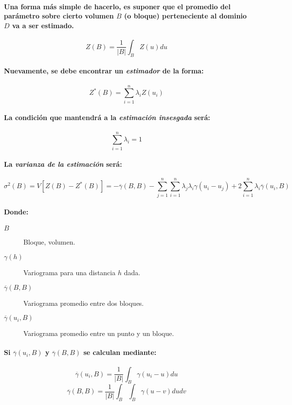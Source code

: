 \paragraph{
Una forma más simple de hacerlo, es suponer que el promedio del parámetro sobre cierto volumen $B$ (o bloque) perteneciente al dominio $D$ va a ser estimado.
}
\begin{equation}
Z(B) = \frac{1}{|B|}\int_{B}Z(u)du
\end{equation}
\paragraph{
Nuevamente, se debe encontrar un \emph{estimador} de la forma:
}
\begin{equation}
Z^*(B)=\sum_{i=1}^n\lambda_i Z(u_i)
\end{equation}
\paragraph{
La condición que mantendrá a la \emph{estimación insesgada} será:
}
\begin{equation}
\sum_{i=1}^n\lambda_i = 1
\end{equation}
\paragraph{
La \emph{varianza de la estimación} será:
}
\begin{equation}
\sigma^2(B) = V[Z(B)-Z^*(B)] = - \overline{\gamma}(B,B) - \sum_{j=1}^n\sum_{i=1}^n \lambda_j \lambda_i \gamma(u_i - u_j) + 2 \sum_{i=1}^n \lambda_i \overline{\gamma}(u_i,B)
\end{equation}
\paragraph{
Donde:
}
\begin{description}
\item[$B$] Bloque, volumen.
\item[$\gamma(h)$] Variograma para una distancia $h$ dada.
\item[$\overline{\gamma}(B,B)$] Variograma promedio entre dos bloques.
\item[$\overline{\gamma}(u_i,B)$] Variograma promedio entre un punto y un bloque.
\end{description}
\paragraph{
Si $\overline{\gamma}(u_i,B)$ y $\overline{\gamma}(B,B)$ se calculan mediante:
}
\begin{equation}
\overline{\gamma}(u_i,B) = \frac{1}{|B|}\int_{B}\gamma(u_i - u) du
\end{equation}
\begin{equation}
\overline{\gamma}(B,B) = \frac{1}{|B|}\int_{B}\int_{B}\gamma(u - v) du dv
\end{equation}
